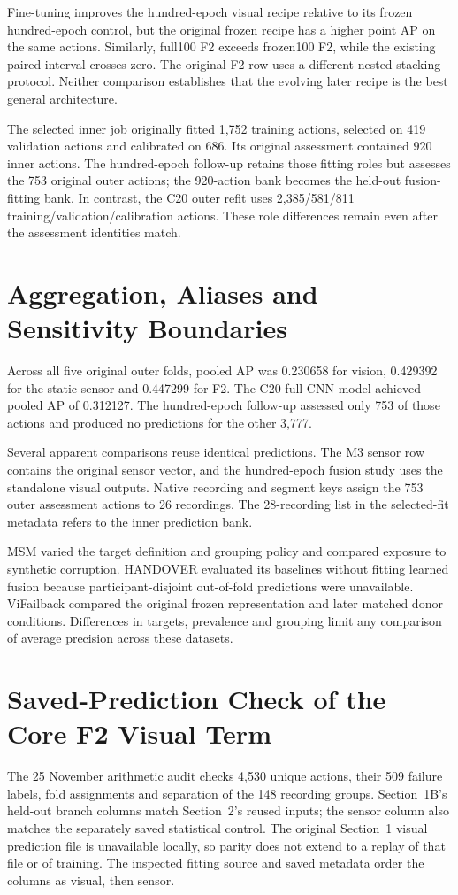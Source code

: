 Fine-tuning improves the hundred-epoch visual recipe relative to its frozen
hundred-epoch control, but the original frozen recipe has a higher point AP on the same
actions. Similarly, full100 F2 exceeds frozen100 F2, while the existing paired interval
crosses zero. The original F2 row uses a different nested stacking protocol. Neither
comparison establishes that the evolving later recipe is the best general architecture.

The selected inner job originally fitted 1,752 training actions, selected on 419
validation actions and calibrated on 686. Its original assessment contained 920 inner
actions. The hundred-epoch follow-up retains those fitting roles but assesses the 753
original outer actions; the 920-action bank becomes the held-out fusion-fitting bank. In
contrast, the C20 outer refit uses 2,385/581/811 training/validation/calibration
actions. These role differences remain even after the assessment identities match.

\section{Aggregation, Aliases and Sensitivity Boundaries}
Across all five original outer folds, pooled AP was 0.230658 for vision, 0.429392 for
the static sensor and 0.447299 for F2. The C20 full-CNN model achieved pooled AP of
0.312127. The hundred-epoch follow-up assessed only 753 of those actions and produced no
predictions for the other 3,777.

Several apparent comparisons reuse identical predictions. The M3 sensor row contains the
original sensor vector, and the hundred-epoch fusion study uses the standalone visual
outputs. Native recording and segment keys assign the 753 outer assessment actions to 26
recordings. The 28-recording list in the selected-fit metadata refers to the inner
prediction bank.

MSM varied the target definition and grouping policy and compared exposure to synthetic
corruption. HANDOVER evaluated its baselines without fitting learned fusion because
participant-disjoint out-of-fold predictions were unavailable. ViFailback compared the
original frozen representation and later matched donor conditions. Differences in
targets, prevalence and grouping limit any comparison of average precision across these
datasets.

\section{Saved-Prediction Check of the Core F2 Visual Term}
The 25 November arithmetic audit checks 4,530 unique actions, their 509 failure labels,
fold assignments and separation of the 148 recording groups. Section~1B's held-out
branch columns match Section~2's reused inputs; the sensor column also matches the
separately saved statistical control. The original Section~1 visual prediction file is
unavailable locally, so parity does not extend to a replay of that file or of training.
The inspected fitting source and saved metadata order the columns as visual, then
sensor.

